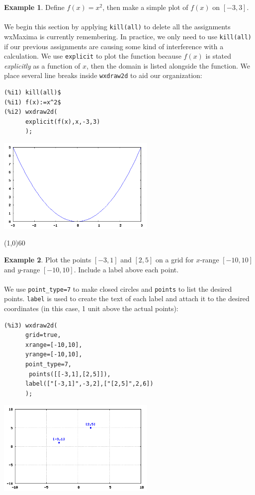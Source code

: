 \documentclass[10.5pt,twoside]{report}
\theoremstyle{definition}
\newtheorem{exmp}{Example}[section]
\begin{document}
\begin{exmp} Define $f(x)=x^2$, then make a simple plot of $f(x)$ on $[-3,3]$.\\
${}$\\

We begin this section by applying \verb|kill(all)| to delete all the assignments wxMaxima is currently remembering.  In practice, we only need to use \verb|kill(all)| if our previous assignments are causing some kind of interference with a calculation.  We use \verb|explicit| to plot the function because $f(x)$ is stated \textit{explicitly} as a function of $x$, then the domain is listed alongside the function.  We place several line breaks inside \verb|wxdraw2d| to aid our organization:

\begin{verbatim}
(%i1) kill(all)$
(%i1) f(x):=x^2$
(%i2) wxdraw2d(
      explicit(f(x),x,-3,3)
      );
\end{verbatim}

\includegraphics[width=3in]{example_0_3_1_1}

\end{exmp}

\line(1,0){60}
\linethickness{0.5mm}
${}$\\

\begin{exmp} Plot the points $[-3,1]$ and $[2,5]$ on a grid for $x$-range $[-10,10]$ and $y$-range $[-10,10]$. Include a label above each point.\\
${}$\\

We use \verb|point_type=7| to make closed circles and \verb|points| to list the desired points.  \verb|label| is used to create the text of each label and attach it to the desired coordinates (in this case, 1 unit above the actual points):

\begin{verbatim}
(%i3) wxdraw2d(
      grid=true,
      xrange=[-10,10],
      yrange=[-10,10],
      point_type=7,
       points([[-3,1],[2,5]]),
      label(["[-3,1]",-3,2],["[2,5]",2,6])
      );
\end{verbatim}

\includegraphics[width=3in]{example_0_3_2_1}

\end{exmp}
\end{document}
